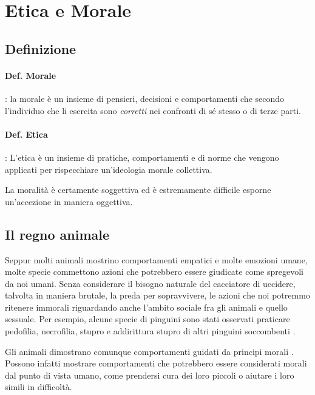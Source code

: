 \documentclass[a4paper, 12pt]{article}
\begin{document}
\pagebreak

\section{Etica e Morale}

\subsection{Definizione}

\paragraph{Def. Morale}:
la morale è un insieme di pensieri, decisioni e comportamenti che secondo l'individuo
che li esercita sono \textit{corretti} nei confronti di sé stesso o di terze parti.

\paragraph{Def. Etica}:
L'etica è un insieme di pratiche, comportamenti e di norme che vengono applicati
per rispecchiare un'ideologia morale collettiva.

La moralità è certamente soggettiva ed è estremamente
difficile esporne un'accezione in maniera oggettiva.

\subsection{Il regno animale}

Seppur molti animali mostrino comportamenti empatici e molte emozioni umane,
molte specie commettono azioni che potrebbero essere giudicate come spregevoli da noi umani.
Senza considerare il bisogno naturale del cacciatore di uccidere, talvolta in maniera brutale,
la preda per sopravvivere, le azioni che noi potremmo ritenere immorali
riguardando anche l'ambito sociale fra gli animali e quello sessuale.
Per esempio, alcune specie di pinguini sono stati osservati praticare
pedofilia, necrofilia, stupro e addirittura stupro di altri pinguini soccombenti
\cite{penguins}.

Gli animali dimostrano comunque comportamenti guidati da principi morali
\cite{rowlands2012oxford} \cite{rowlands2015can} \cite{andrews2018routledge}.
Possono infatti mostrare comportamenti che potrebbero essere considerati morali dal punto di vista umano,
come prendersi cura dei loro piccoli o aiutare i loro simili in difficoltà.
\end{document}
